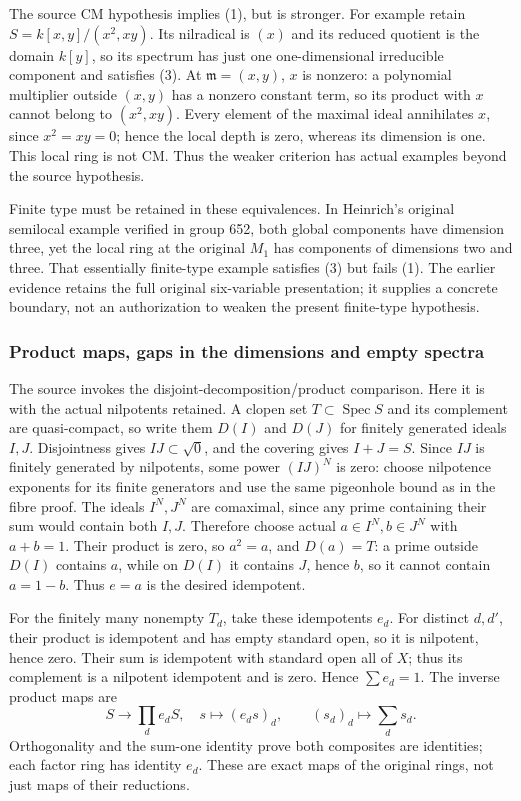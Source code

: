 The source CM hypothesis implies (1), but is stronger. For example retain \(S=k[x,y]/(x^2,xy)\). Its nilradical is \((x)\) and its reduced quotient is the domain \(k[y]\), so its spectrum has just one one-dimensional irreducible component and satisfies (3). At \(\mathfrak m=(x,y)\), \(x\) is nonzero: a polynomial multiplier outside \((x,y)\) has a nonzero constant term, so its product with \(x\) cannot belong to \((x^2,xy)\). Every element of the maximal ideal annihilates \(x\), since \(x^2=xy=0\); hence the local depth is zero, whereas its dimension is one. This local ring is not CM. Thus the weaker criterion has actual examples beyond the source hypothesis.

Finite type must be retained in these equivalences. In Heinrich's original semilocal example verified in group 652, both global components have dimension three, yet the local ring at the original \(M_1\) has components of dimensions two and three. That essentially finite-type example satisfies (3) but fails (1). The earlier evidence retains the full original six-variable presentation; it supplies a concrete boundary, not an authorization to weaken the present finite-type hypothesis.

\subsubsection{Product maps, gaps in the dimensions and empty spectra}\label{algebra-proof-025-product-maps-gaps-in-the-dimensions-and-empty-spectra}

The source invokes the disjoint-decomposition/product comparison. Here it is with the actual nilpotents retained. A clopen set \(T\subset\operatorname{Spec}S\) and its complement are quasi-compact, so write them \(D(I)\) and \(D(J)\) for finitely generated ideals \(I,J\). Disjointness gives \(IJ\subset\sqrt0\), and the covering gives \(I+J=S\). Since \(IJ\) is finitely generated by nilpotents, some power \((IJ)^N\) is zero: choose nilpotence exponents for its finite generators and use the same pigeonhole bound as in the fibre proof. The ideals \(I^N,J^N\) are comaximal, since any prime containing their sum would contain both \(I,J\). Therefore choose actual \(a\in I^N,b\in J^N\) with \(a+b=1\). Their product is zero, so \(a^2=a\), and \(D(a)=T\): a prime outside \(D(I)\) contains \(a\), while on \(D(I)\) it contains \(J\), hence \(b\), so it cannot contain \(a=1-b\). Thus \(e=a\) is the desired idempotent.

For the finitely many nonempty \(T_d\), take these idempotents \(e_d\). For distinct \(d,d'\), their product is idempotent and has empty standard open, so it is nilpotent, hence zero. Their sum is idempotent with standard open all of \(X\); thus its complement is a nilpotent idempotent and is zero. Hence \(\sum e_d=1\). The inverse product maps are \[
 S\longrightarrow\prod_d e_dS,\quad s\longmapsto(e_ds)_d,
 \qquad (s_d)_d\longmapsto\sum_d s_d.
\] Orthogonality and the sum-one identity prove both composites are identities; each factor ring has identity \(e_d\). These are exact maps of the original rings, not just maps of their reductions.

